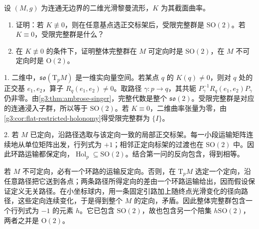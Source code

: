 \BookExercises

\begin{exercise}\label{g3:ex:surface-holonomy}
	设 \((M,g)\) 为连通无边界的二维光滑黎曼流形，\(K\) 为其截面曲率。
	\begin{enumerate}
		\item 证明：若 \(K\not\equiv0\)，则在任意基点选正交标架后，受限完整群是 \(\mathrm{SO}(2)\)。若 \(K\equiv0\)，受限完整群是什么？
		\item 在 \(K\not\equiv0\) 的条件下，证明整体完整群在 \(M\) 可定向时是 \(\mathrm{SO}(2)\)，在 \(M\) 不可定向时是 \(\mathrm O(2)\)。
	\end{enumerate}
\end{exercise}
\begin{solution}
	1. 二维中，\(\mathfrak{so}(\mathrm T_pM)\) 是一维实向量空间。若某点 \(q\) 的 \(K(q)\ne0\)，则对 \(q\) 处的正交基 \(e_1,e_2\)，算子 \(R_q(e_1,e_2)\ne0\)。取路径 \(\gamma:p\to q\)，其共轭 \(P_\gamma^{-1}R_q(e_1,e_2)P_\gamma\) 仍非零。由\cref{g3:thm:ambrose-singer}，完整代数是整个 \(\mathfrak{so}(2)\)。受限完整群是对应的连通浸入子群，所以等于 \(\mathrm{SO}(2)\)。若 \(K\equiv0\)，二维曲率张量为零，由\cref{g3:cor:flat-restricted-holonomy}得受限完整群为 \(\{I\}\)。

	2. 若 \(M\) 已定向，沿路径选取与该定向一致的局部正交标架。每一小段运输矩阵连续地从单位矩阵出发，行列式为 \(+1\)；相邻正定向标架的过渡也在 \(\mathrm{SO}(2)\) 中。因此环路运输都保定向，\(\operatorname{Hol}_p\subseteq\mathrm{SO}(2)\)。结合第一问的反向包含，得到相等。

	若 \(M\) 不可定向，必有一个环路的运输反定向。否则，在 \(\mathrm T_pM\) 选定一个定向，沿任意路径把它送到各点；两条路径所得定向的差由一个环路运输给出，因而假设保证定义无关路径。在小坐标球内，用一条固定引路加上随终点光滑变化的径向路径，这些定向连续变化，于是得到整个 \(M\) 的定向，矛盾。因此整体完整群包含一个行列式为 \(-1\) 的元素 \(h\)。它已包含 \(\mathrm{SO}(2)\)，故也包含另一个陪集 \(h\mathrm{SO}(2)\)，两者之并是 \(\mathrm O(2)\)。
\end{solution}

